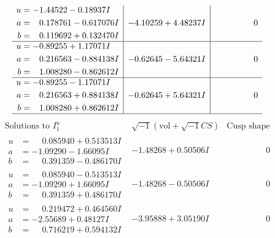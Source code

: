 \documentclass[1p]{elsarticle_modified}
\theoremstyle{definition}
\newcommand{\I}{\sqrt{-1}}
\begin{document}
$$\begin{array}{c|c|c}
\begin{aligned}
u &= -1.44522 - 0.18937 I \\
a &= \phantom{-}0.178761 - 0.617076 I \\
b &= \phantom{-}0.119692 + 0.132470 I\end{aligned}
 & -4.10259 + 4.48237 I & \phantom{-0.000000 } 0 \\ \hline\begin{aligned}
u &= -0.89255 + 1.17071 I \\
a &= \phantom{-}0.216563 - 0.884138 I \\
b &= \phantom{-}1.008280 - 0.862612 I\end{aligned}
 & -0.62645 - 5.64321 I & \phantom{-0.000000 } 0 \\ \hline\begin{aligned}
u &= -0.89255 - 1.17071 I \\
a &= \phantom{-}0.216563 + 0.884138 I \\
b &= \phantom{-}1.008280 + 0.862612 I\end{aligned}
 & -0.62645 + 5.64321 I & \phantom{-0.000000 } 0\\
 \hline 
 \end{array}$$\newpage$$\begin{array}{c|c|c}  
\text{Solutions to }I^u_{1}& \I (\text{vol} + \sqrt{-1}CS) & \text{Cusp shape}\\
 \hline 
\begin{aligned}
u &= \phantom{-}0.085940 + 0.513513 I \\
a &= -1.09290 - 1.66095 I \\
b &= \phantom{-}0.391359 - 0.486170 I\end{aligned}
 & -1.48268 + 0.50506 I & \phantom{-0.000000 } 0 \\ \hline\begin{aligned}
u &= \phantom{-}0.085940 - 0.513513 I \\
a &= -1.09290 + 1.66095 I \\
b &= \phantom{-}0.391359 + 0.486170 I\end{aligned}
 & -1.48268 - 0.50506 I & \phantom{-0.000000 } 0 \\ \hline\begin{aligned}
u &= \phantom{-}0.219472 + 0.464560 I \\
a &= -2.55689 + 0.48127 I \\
b &= \phantom{-}0.716219 + 0.594132 I\end{aligned}
 & -3.95888 + 3.05190 I & \phantom{-0.000000 } 0 \\ \hline\begin{aligned}

\end{aligned}
\end{array}$$
\end{document}
